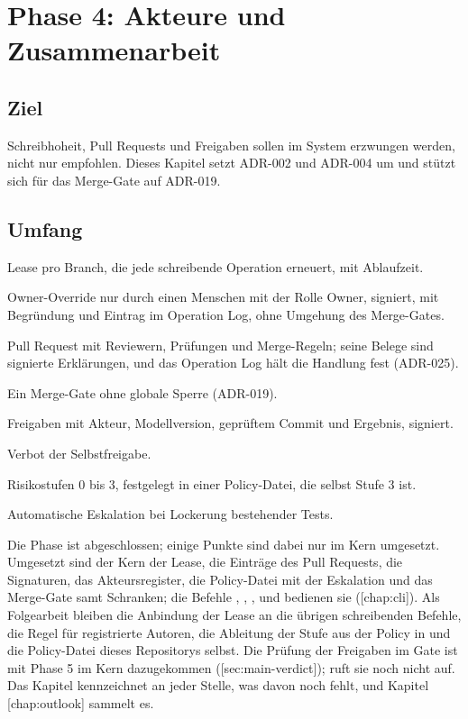 \chapter[chap:phase4]{Phase 4: Akteure und Zusammenarbeit}

\section{Ziel}

Schreibhoheit, Pull Requests und Freigaben sollen im System erzwungen werden, nicht nur
empfohlen.
Dieses Kapitel setzt ADR-002 und ADR-004 um und stützt sich für das Merge-Gate auf ADR-019.

\section{Umfang}

\startitemize
\item Lease pro Branch, die jede schreibende Operation erneuert, mit Ablaufzeit.
\item Owner-Override nur durch einen Menschen mit der Rolle Owner, signiert, mit Begründung und
Eintrag im Operation Log, ohne Umgehung des Merge-Gates.
\item Pull Request mit Reviewern, Prüfungen und Merge-Regeln; seine Belege sind signierte
Erklärungen, und das Operation Log hält die Handlung fest (ADR-025).
\item Ein Merge-Gate ohne globale Sperre (ADR-019).
\item Freigaben mit Akteur, Modellversion, geprüftem Commit und Ergebnis, signiert.
\item Verbot der Selbstfreigabe.
\item Risikostufen 0 bis 3, festgelegt in einer Policy-Datei, die selbst Stufe 3 ist.
\item Automatische Eskalation bei Lockerung bestehender Tests.
\stopitemize

Die Phase ist abgeschlossen; einige Punkte sind dabei nur im Kern umgesetzt.
Umgesetzt sind der Kern der Lease, die Einträge des Pull Requests, die Signaturen,
das Akteursregister, die Policy-Datei mit der Eskalation und das Merge-Gate samt Schranken;
die Befehle , , ,  und  bedienen
sie ([chap:cli]).
Als Folgearbeit bleiben die Anbindung der Lease an die übrigen schreibenden Befehle,
die Regel für registrierte Autoren,
die Ableitung der Stufe aus der Policy in  und die Policy-Datei dieses Repositorys
selbst.
Die Prüfung der Freigaben im Gate ist mit Phase 5 im Kern dazugekommen
([sec:main-verdict]);  ruft sie noch nicht auf.
Das Kapitel kennzeichnet an jeder Stelle, was davon noch fehlt, und Kapitel
\in{}[chap:outlook] sammelt es.


